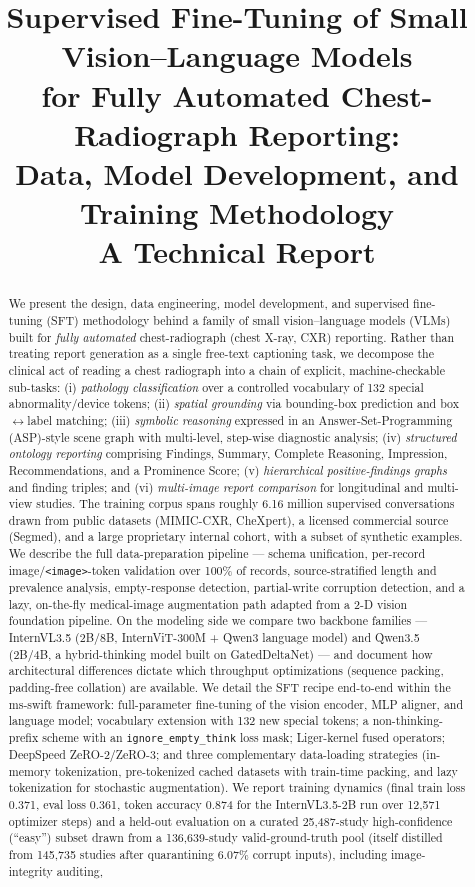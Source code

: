 \documentclass[11pt,a4paper]{article}
\title{\vspace{-1.5em}\textbf{Supervised Fine-Tuning of Small Vision--Language Models\\ for Fully Automated Chest-Radiograph Reporting:\\ Data, Model Development, and Training Methodology}\\[0.6em]
\large A Technical Report}
\author{}
\date{}
\begin{document}
\maketitle
\thispagestyle{fancy}

\begin{abstract}
\noindent
We present the design, data engineering, model development, and supervised fine-tuning (SFT) methodology behind a family of small vision--language models (VLMs) built for \emph{fully automated} chest-radiograph (chest X-ray, CXR) reporting. Rather than treating report generation as a single free-text captioning task, we decompose the clinical act of reading a chest radiograph into a chain of explicit, machine-checkable sub-tasks: (i) \emph{pathology classification} over a controlled vocabulary of 132 special abnormality/device tokens; (ii) \emph{spatial grounding} via bounding-box prediction and box$\leftrightarrow$label matching; (iii) \emph{symbolic reasoning} expressed in an Answer-Set-Programming (ASP)-style scene graph with multi-level, step-wise diagnostic analysis; (iv) \emph{structured ontology reporting} comprising Findings, Summary, Complete Reasoning, Impression, Recommendations, and a Prominence Score; (v) \emph{hierarchical positive-findings graphs} and finding triples; and (vi) \emph{multi-image report comparison} for longitudinal and multi-view studies. The training corpus spans roughly 6.16 million supervised conversations drawn from public datasets (MIMIC-CXR, CheXpert), a licensed commercial source (Segmed), and a large proprietary internal cohort, with a subset of synthetic examples. We describe the full data-preparation pipeline --- schema unification, per-record image/\texttt{<image>}-token validation over 100\% of records, source-stratified length and prevalence analysis, empty-response detection, partial-write corruption detection, and a lazy, on-the-fly medical-image augmentation path adapted from a 2-D vision foundation pipeline. On the modeling side we compare two backbone families --- InternVL3.5 (2B/8B, InternViT-300M + Qwen3 language model) and Qwen3.5 (2B/4B, a hybrid-thinking model built on GatedDeltaNet) --- and document how architectural differences dictate which throughput optimizations (sequence packing, padding-free collation) are available. We detail the SFT recipe end-to-end within the ms-swift framework: full-parameter fine-tuning of the vision encoder, MLP aligner, and language model; vocabulary extension with 132 new special tokens; a non-thinking-prefix scheme with an \texttt{ignore\_empty\_think} loss mask; Liger-kernel fused operators; DeepSpeed ZeRO-2/ZeRO-3; and three complementary data-loading strategies (in-memory tokenization, pre-tokenized cached datasets with train-time packing, and lazy tokenization for stochastic augmentation). We report training dynamics (final train loss 0.371, eval loss 0.361, token accuracy 0.874 for the InternVL3.5-2B run over 12{,}571 optimizer steps) and a held-out evaluation on a curated 25{,}487-study high-confidence (``easy'') subset drawn from a 136{,}639-study valid-ground-truth pool (itself distilled from 145{,}735 studies after quarantining 6.07\% corrupt inputs), including image-integrity auditing, 
\end{abstract}
\end{document}
